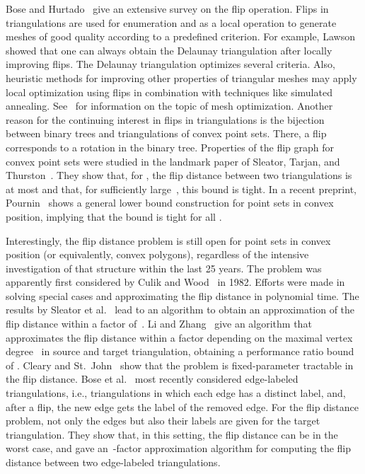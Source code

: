\documentclass[11pt,a4paper]{article}
\begin{document}
Bose and Hurtado~\cite{survey} give an extensive survey on the flip operation.
Flips in triangulations are used for enumeration and as a local operation to generate meshes of good quality according to a predefined criterion.
For example, Lawson~\cite{lawson_delaunay} showed that one can always obtain the Delaunay triangulation after  locally improving flips.
The Delaunay triangulation optimizes several criteria.
Also, heuristic methods for improving other properties of triangular meshes may apply local optimization using flips in combination with techniques like simulated annealing.
See~\cite{bern_eppstein,hjelle} for information on the topic of mesh optimization.
Another reason for the continuing interest in flips in triangulations is the bijection between binary trees and triangulations of convex point sets.
There, a flip corresponds to a rotation in the binary tree.
Properties of the flip graph for convex point sets were studied in the landmark paper of Sleator, Tarjan, and Thurston~\cite{sleator}.
They show that, for , the flip distance between two triangulations is at most  and that, for sufficiently large~, this bound is tight.
In a recent preprint, Pournin~\cite{pournin} shows a general lower bound construction for point sets in convex position, implying that the bound  is tight for all .

Interestingly, the flip distance problem is still open for point sets in convex position (or equivalently, convex polygons), regardless of the intensive investigation of that structure within the last 25 years.
The problem was apparently first considered by Culik and Wood~\cite{tree_similarity} in 1982.
Efforts were made in solving special cases and approximating the flip distance in polynomial time.
The results by Sleator et al.~\cite{sleator} lead to an algorithm to obtain an approximation of the flip distance within a factor of~.
Li and Zhang~\cite{convex_approx_diagonals} give an algorithm that approximates the flip distance within a factor depending on the maximal vertex degree~ in source and target triangulation, obtaining a performance ratio bound of .
Cleary and St.~John~\cite{fpt_convex_flips} show that the problem is fixed-parameter tractable in the flip distance.
Bose et al.~\cite{edge_labelled_triangulations} most recently considered edge-labeled triangulations, i.e., triangulations in which each edge has a distinct label, and, after a flip, the new edge gets the label of the removed edge.
For the flip distance problem, not only the edges but also their labels are given for the target triangulation.
They show that, in this setting, the flip distance can be  in the worst case, and gave an~-factor approximation algorithm for computing the flip distance between two edge-labeled triangulations.
\end{document}

